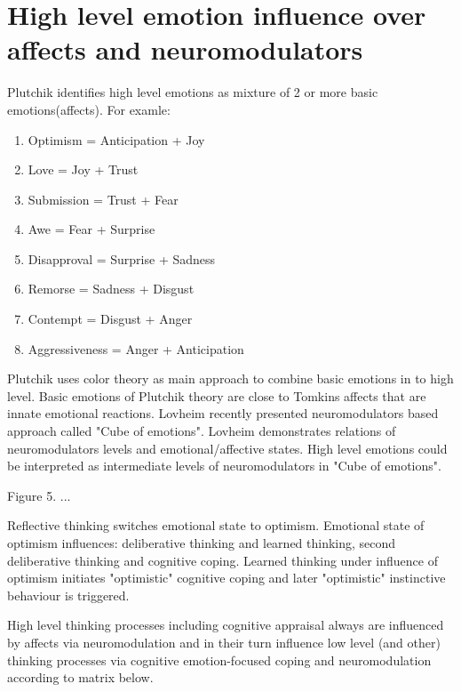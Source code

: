 \section{High level emotion influence over affects and neuromodulators}

Plutchik identifies high level emotions \cite{natureofemotions} as mixture of 2 or more basic emotions(affects). For examle:

\begin{enumerate}
 \item  Optimism =	Anticipation + Joy
 \item  Love =	Joy + Trust
 \item  Submission = Trust + Fear
 \item  Awe = Fear + Surprise
 \item  Disapproval = Surprise + Sadness
 \item  Remorse = Sadness + Disgust
 \item  Contempt = Disgust + Anger
 \item  Aggressiveness =	Anger + Anticipation
\end{enumerate}

Plutchik uses color theory as main approach to combine basic emotions in to high level. Basic emotions of Plutchik theory are close to Tomkins affects that are innate emotional reactions. Lovheim recently presented neuromodulators based approach called "Cube of emotions"\cite{cubeofemotions}. Lovheim demonstrates relations of neuromodulators levels and emotional/affective states. High level emotions could be interpreted as intermediate levels of neuromodulators in "Cube of emotions"\cite{cubeofemotions}.

\begin{center}
Figure 5. ...
\end{center}

Reflective thinking switches emotional state to optimism. Emotional state of optimism influences: deliberative thinking and learned thinking, second deliberative thinking and cognitive coping. Learned thinking under influence of optimism initiates "optimistic" cognitive coping and later "optimistic" instinctive behaviour is triggered.

High level thinking processes including cognitive appraisal always are influenced by affects via neuromodulation and in their turn influence low level (and other) thinking processes via cognitive emotion-focused coping and neuromodulation according to matrix below.

